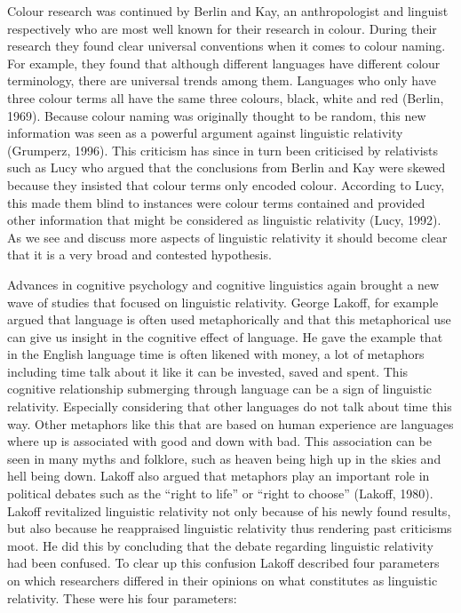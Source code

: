 
	Colour research was continued by Berlin and Kay, an anthropologist and linguist respectively who are most well known for their research in colour. During their research they found clear universal conventions when it comes to colour naming. For example, they found that although different languages have different colour terminology, there are universal trends among them. Languages who only have three colour terms all have the same three colours, black, white and red (Berlin, 1969). Because colour naming was originally thought to be random, this new information was seen as a powerful argument against linguistic relativity (Grumperz, 1996). This criticism has since in turn been criticised by relativists such as Lucy who argued that the conclusions from Berlin and Kay were skewed because they insisted that colour terms only encoded colour. According to Lucy, this made them blind to instances were colour terms contained and provided other information that might be considered as linguistic relativity (Lucy, 1992). As we see and discuss more aspects of linguistic relativity it should become clear that it is a very broad and contested hypothesis.  

 
	Advances in cognitive psychology and cognitive linguistics again brought a new wave of studies that focused on linguistic relativity. George Lakoff, for example argued that language is often used metaphorically and that this metaphorical use can give us insight in the cognitive effect of language. He gave the example that in the English language time is often likened with money, a lot of metaphors including time talk about it like it can be invested, saved and spent. This cognitive relationship submerging through language can be a sign of linguistic relativity. Especially considering that other languages do not talk about time this way. Other metaphors like this that are based on human experience are languages where up is associated with good and down with bad. This association can be seen in many myths and folklore, such as heaven being high up in the skies and hell being down. Lakoff also argued that metaphors play an important role in political debates such as the “right to life” or “right to choose” (Lakoff, 1980). Lakoff revitalized linguistic relativity not only because of his newly found results, but also because he reappraised linguistic relativity thus rendering past criticisms moot. He did this by concluding that the debate regarding linguistic relativity had been confused. To clear up this confusion Lakoff described four parameters on which researchers differed in their opinions on what constitutes as linguistic relativity. These were his four parameters: 


